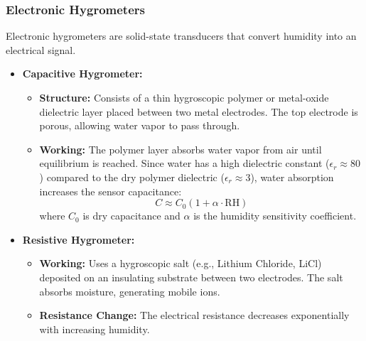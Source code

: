 \documentclass[12pt,a4paper]{article}
\begin{document}
\subsubsection{Electronic Hygrometers}
Electronic hygrometers are solid-state transducers that convert humidity into an electrical signal.
\begin{itemize}[leftmargin=*, itemsep=3.5pt]
  \item \textbf{Capacitive Hygrometer:}
    \begin{itemize}[leftmargin=*, itemsep=2.5pt, topsep=0pt]
      \item \textbf{Structure:} Consists of a thin hygroscopic polymer or metal-oxide dielectric layer placed between two metal electrodes. The top electrode is porous, allowing water vapor to pass through.
      \item \textbf{Working:} The polymer layer absorbs water vapor from air until equilibrium is reached. Since water has a high dielectric constant ($\epsilon_r \approx 80$) compared to the dry polymer dielectric ($\epsilon_r \approx 3$), water absorption increases the sensor capacitance:
        \begin{equation}
          C \approx C_0 (1 + \alpha \cdot \text{RH})
        \end{equation}
        where $C_0$ is dry capacitance and $\alpha$ is the humidity sensitivity coefficient.
    \end{itemize}
  \item \textbf{Resistive Hygrometer:}
    \begin{itemize}[leftmargin=*, itemsep=2.5pt, topsep=0pt]
      \item \textbf{Working:} Uses a hygroscopic salt (e.g., Lithium Chloride, LiCl) deposited on an insulating substrate between two electrodes. The salt absorbs moisture, generating mobile ions.
      \item \textbf{Resistance Change:} The electrical resistance decreases exponentially with increasing humidity.
    \end{itemize}
\end{itemize}
\end{document}
